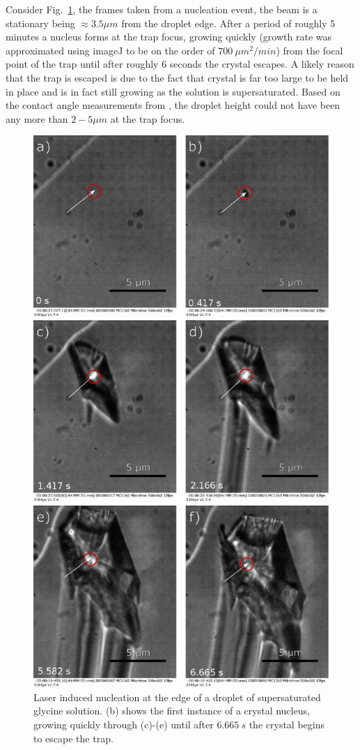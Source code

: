 Consider Fig.~\ref{fig:stationary_beam}, the frames taken from 
a nucleation event, the beam is a stationary being $\approx3.5 
\mu m$ from the droplet edge. After a period of roughly 5 minutes 
a nucleus forms at the trap focus, growing quickly (growth rate 
was approximated using imageJ to be on the order of $700\ \mu 
m^2/min$) from the focal point of the trap until after roughly 
$6$ seconds the crystal escapes. A likely reason that the trap 
is escaped is due to the fact that crystal is far too large to 
be held in place and is in fact still growing as the solution is supersaturated. Based on the contact angle measurements from \cite{Flannigan2023}, the droplet height could not have been 
any more than $2-5\mu m$ at the trap focus.
\begin{figure}[h!]
	\centering
	\includegraphics[width=\linewidth, height=1.3\linewidth]{frames_no_beam_movement.pdf}
	\caption{Laser induced nucleation at the edge of a droplet of supersaturated 
	glycine solution. (b) shows the first instance of a crystal nucleus, growing 
	quickly through (c)-(e) until after $6.665\ s$ the crystal begins to escape 
	the trap.}
	\label{fig:stationary_beam}
\end{figure}

